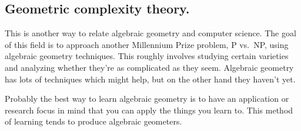 \subsection*{Geometric complexity theory.}
This is another way to relate algebraic geometry and computer science. The goal of this field is to approach
another Millennium Prize problem, P vs.\ NP, using algebraic geometry techniques. This roughly involves studying
certain varieties and analyzing whether they're as complicated as they seem. Algebraic geometry has lots of
techniques which might help, but on the other hand they haven't yet.

Probably the best way to learn algebraic geometry is to have an application or research focus in mind that you can
apply the things you learn to. This method of learning tends to produce algebraic geometers.
